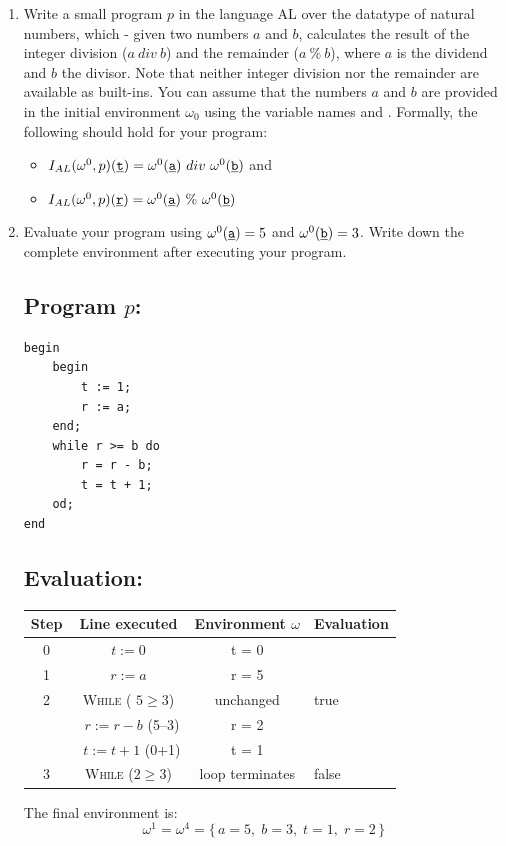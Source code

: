 \documentclass[10pt, a4paper]{article}
\begin{document}
\begin{enumerate}
    \item Write a small program $p$ in the language AL over the datatype of natural numbers, which - given two numbers $a$ and $b$, calculates the result of the integer division ($a\ div\ b$) and the remainder ($a\ \%\ b$), where $a$ is the dividend and $b$ the divisor. Note that neither integer division nor the remainder are available as built-ins. You can assume that the numbers $a$ and $b$ are provided in the initial environment $\omega_0$ using the variable names  and . Formally, the following should hold for your program:
    \begin{itemize}
        \item $I_{AL}(\omega^0,p)(\underline{\texttt{t}}) = \omega^0(\underline{\texttt{a}})\ div\ \omega^0(\underline{\texttt{b}})$ and
        \item $I_{AL}(\omega^0,p)(\underline{\texttt{r}}) = \omega^0(\underline{\texttt{a}})\ \%\ \omega^0(\underline{\texttt{b}})$
    \end{itemize}
    \item Evaluate your program using $\omega^0(\underline{\texttt{a}}) = 5$ and $\omega^0(\underline{\texttt{b}}) = 3$. Write down the complete environment after executing your program.



    \subsection{Program $p$:}

\lstset{frame=single,numbers=left}
\begin{lstlisting}
begin
    begin
        t := 1;
        r := a;
    end;
    while r >= b do
        r = r - b;
        t = t + 1;
    od;
end
\end{lstlisting}

\subsection{Evaluation:}
\begin{center}
\begin{tabular}{@{}cccl@{}}
\toprule
Step & Line executed & Environment \(\omega\) & Evaluation \\ \midrule
0 &  \(t:=0\) & 
     t = 0 \) & \\[2pt]
1 &  \(r:=a\) & 
     r = 5 & \\[2pt]
2 & \textsc{While} ( \(5\ge 3\)) & 
      unchanged & true \\[2pt]
\;&\quad\ \(r:=r-b\) (5–3) & 
     r = 2 \\[2pt]
\;&\quad\ \(t:=t+1\) (0+1) & 
     t = 1 & \\[2pt]
3 & \textsc{While} (\(2\ge 3\)) & 
      loop terminates & false \\ \bottomrule
\end{tabular}
\end{center}
The final environment is:
 \[
\boxed{\;
  \omega^{1} = \omega^{4}
  = \{\,a=5,\; b=3,\; t=1,\; r=2\,\}
\;}
\]


\end{enumerate}
\end{document}
